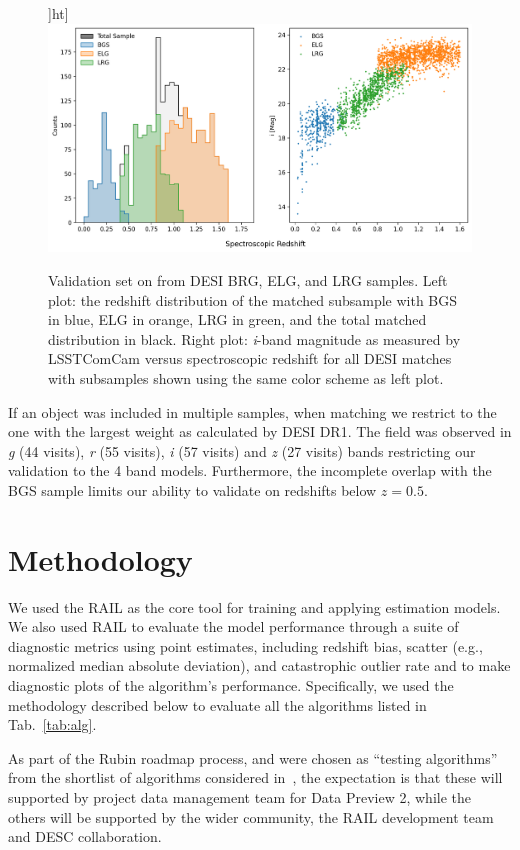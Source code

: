 \begin{figure}]ht]
    \centering
    \includegraphics[width=.8\linewidth]{figures/desi_sample_histogram.png}
    \caption{Validation set on  from DESI BRG, ELG, and LRG samples. Left plot: the redshift distribution of the matched subsample with BGS in blue, ELG in orange, LRG in green, and the total matched distribution in black. Right plot: \textit{i}-band magnitude as measured by LSSTComCam versus spectroscopic redshift for all DESI matches with subsamples shown using the same color scheme as left plot.}
    \label{fig:desi-subsample-hist}
\end{figure}

If an object was included in multiple samples, when matching we restrict to the one with the largest weight as calculated by DESI DR1.
The  field was observed in \textit{g} (44 visits), \textit{r} (55 visits), \textit{i} (57 visits) and \textit{z} (27 visits) bands restricting our validation to the 4 band models.
Furthermore, the incomplete overlap with the BGS sample limits our ability to validate on redshifts below $z=0.5$. 


\section{Methodology}
\label{sec:method:0}

We used the RAIL as the core tool for training and applying \photoz estimation models.   We also used RAIL to evaluate the model performance through a suite of diagnostic metrics using \photoz point estimates, including redshift bias, scatter (e.g., normalized median absolute deviation), and catastrophic outlier rate and to make diagnostic plots of the algorithm's performance.  Specifically, we used the methodology described below to evaluate all the algorithms listed in Tab.~\ref{tab:alg}.

As part of the Rubin \photoz roadmap process,  and  were chosen as ``testing algorithms'' from the shortlist of algorithms considered in~\citep{DMTN:049}, the expectation is that these will supported by project data management team for Data Preview 2,  while the others will be supported by the wider community, the RAIL development team and DESC collaboration.


